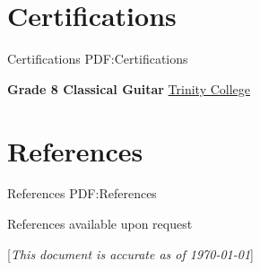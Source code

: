 \documentclass[a4paper,10pt,oneside]{article}
\newcommand{\CVNote}{This document is accurate as of {\today}}
\begin{document}
\begin{body}
\section
{Certifications}
{Certifications}
{PDF:Certifications}





\textbf{Grade 8 Classical Guitar}
\href{http://www.trinitycollege.com/}{Trinity College}
\hfill {}



\section
{References}
{References}
{PDF:References}



\par References available upon request

\end{body}


\begin{flushright}
\scriptsize%
[\textit{\CVNote}]%
\hspace{2.0mm}\null
\end{flushright}

\label{LastPage}~
\end{document}
